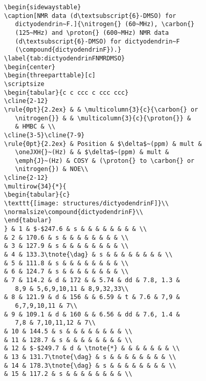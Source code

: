 \small\singlespacing
\begin{verbatim}
\begin{sidewaystable}
\caption[NMR data (d\textsubscript{6}-DMSO) for
   dictyodendrin~F.]{\nitrogen{} (60~MHz), \carbon{}
   (125~MHz) and \proton{} (600~MHz) NMR data
   (d\textsubscript{6}-DMSO) for dictyodendrin~F
   (\compound{dictyodendrinF}).}
\label{tab:dictyodendrinFNMRDMSO}
\begin{center}
\begin{threeparttable}[c]
\scriptsize
\begin{tabular}{c c ccc c ccc ccc}
\cline{2-12}
\rule{0pt}{2.2ex} & & \multicolumn{3}{c}{\carbon{} or
   \nitrogen{}} & & \multicolumn{3}{c}{\proton{}} &
   & HMBC & \\
\cline{3-5}\cline{7-9}
\rule{0pt}{2.2ex} & Position & $\delta$~(ppm) & mult &
   \oneJXH{}~(Hz) & & $\delta$~(ppm) & mult &
   \emph{J}~(Hz) & COSY & (\proton{} to \carbon{} or
   \nitrogen{}) & NOE\\
\cline{2-12}
\multirow{34}{*}{
\begin{tabular}{c}
\texttt{[image: structures/dictyodendrinF]}\\
\normalsize\compound{dictyodendrinF}\\
\end{tabular}
} & 1 & $-$247.6 & s & & & & & & & & \\
& 2 & 170.6 & s & & & & & & & & \\
& 3 & 127.9 & s & & & & & & & & \\
& 4 & 133.3\tnote{\dag} & s & & & & & & & & \\
& 5 & 111.8 & s & & & & & & & & \\
& 6 & 124.7 & s & & & & & & & & \\
& 7 & 114.2 & d & 172 & & 5.74 & dd & 7.8, 1.3 &
   8,9 & 5,6,9,10,11 & 8,9,32,33\\
& 8 & 121.9 & d & 156 & & 6.59 & t & 7.6 & 7,9 &
   6,7,9,10,11 & 7\\
& 9 & 109.1 & d & 160 & & 6.56 & dd & 7.6, 1.4 &
   7,8 & 7,10,11,12 & 7\\
& 10 & 144.5 & s & & & & & & & & \\
& 11 & 128.7 & s & & & & & & & & \\
& 12 & $-$249.7 & d & \tnote{*} & & & & & & & \\
& 13 & 131.7\tnote{\dag} & s & & & & & & & & \\
& 14 & 178.3\tnote{\dag} & s & & & & & & & & \\
& 15 & 117.2 & s & & & & & & & & \\

\end{verbatim}
